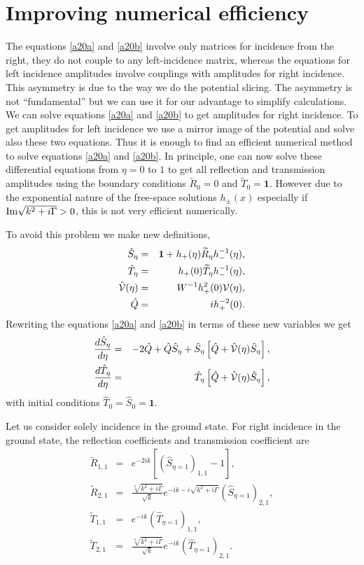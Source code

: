 \section{Improving numerical efficiency}
%
{The equations \eqref{a20a} and \eqref{a20b}} involve only  matrices for incidence from the right, they  do not couple to any left-incidence matrix, whereas the equations for left incidence
amplitudes involve couplings with amplitudes for right incidence. This asymmetry is due to the way we do the potential slicing. The asymmetry  is not ``fundamental''
but we can use it for our advantage to simplify calculations. We can solve equations \eqref{a20a} and \eqref{a20b} to get amplitudes for right incidence.
To get amplitudes for left incidence we use a mirror image of the potential and solve also these two equations.
Thus it is enough to find an efficient numerical method to solve equations \eqref{a20a} and \eqref{a20b}.
In principle, one can now solve these differential equations from $\eta=0$ to $1$ to get all reflection and transmission amplitudes using the boundary conditions $\widetilde{R}_{0}=0$ and $\widetilde{T}_{0}=\mathbf{1}$. However due to the exponential nature of the
free-space solutions $h_{\pm}(x)$ especially if ${\rm Im}\sqrt{k^2+i \Gamma}>0$, this is not very efficient numerically.

To avoid this problem we make new definitions,
%
\begin{eqnarray}
	\hat{S}_{\eta}&=&\mathbf{1}+h_{+}(\eta)\widetilde{R}_{\eta}h_{-}^{-1}(\eta),
	\nonumber\\
	\hat{T}_{\eta}&=&h_{+}(0)\widetilde{T}_{\eta}h_{-}^{-1}(\eta),
	\nonumber\\
	\hat{\cal V}(\eta)&=&W^{-1}h_{+}^{2}(0){\cal V}(\eta),
	\nonumber\\
	\hat{Q}&=&i h_{+}^{-2}(0).
\end{eqnarray}
%
Rewriting {the equations \eqref{a20a} and \eqref{a20b}} in terms of these new variables we get
%
\begin{eqnarray}
	\frac{d \hat{S}_{\eta}}{d \eta}&=&-2 \hat{Q}+\hat{Q}\hat{S}_{\eta}+\hat{S}_{\eta}\left[\hat{Q}+\hat{\cal V}(\eta)\hat{S}_{\eta}\right],
	\nonumber\\
	\frac{d \hat{T}_{\eta}}{d \eta}&=& \hat{T}_{\eta}\left[\hat{Q}+\hat{\cal V}(\eta)\hat{S}_{\eta}\right],
\end{eqnarray}
%
with initial conditions $\hat{T}_{0} =\hat{S}_{0}=\mathbf{1}$.

Let us consider solely incidence in the ground state. For right incidence in the ground state,
the reflection coefficients and transmission coefficient are
%
\begin{eqnarray}
	\widetilde R_{1,1} &=& e^{-2ik} \left[(\hat S_{\eta=1})_{1,1} - 1 \right],
	\nonumber\\
	\widetilde R_{2,1} &=&
	\frac{\sqrt[4]{k^2+i \Gamma}}{\sqrt{k}} e^{-ik-i\sqrt{k^2+i \Gamma}} (\hat S_{\eta=1})_{2,1},
	\nonumber\\
	\widetilde T_{1,1} &=& e^{-i k} (\hat T_{\eta=1})_{1,1},
	\nonumber\\
	\widetilde T_{2,1} &=& \frac{\sqrt[4]{k^2+i \Gamma}}{\sqrt{k}} e^{-i k} (\hat T_{\eta=1})_{2,1}.
\end{eqnarray}
\vspace*{1cm}


